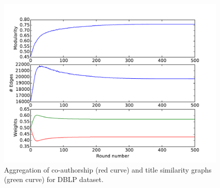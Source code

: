 \documentclass[twoside,twocolumn]{article}
\begin{document}
\begin{figure}[t]
\begin{centering}
\includegraphics[width=\columnwidth]{figures/DBLP-consistentNO+NEF.pdf}
\par\end{centering}
\caption{Aggregation of co-authorship (red curve) and title similarity graphs
(green curve) for DBLP dataset.} 
\label{fig:dblp}
\end{figure}
\end{document}
